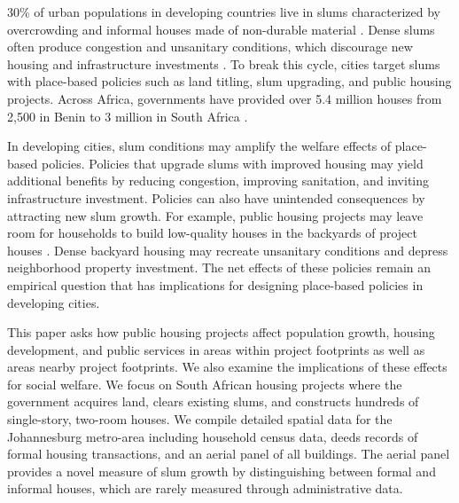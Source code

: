 \documentclass[12pt]{article}
\begin{document}
30\% of urban populations in developing countries live in slums characterized by overcrowding and informal houses made of non-durable material \citep{mdg}.  Dense slums often produce congestion and unsanitary conditions, which discourage new housing and infrastructure investments \citep{marx2013slums}.  To break this cycle, cities target slums with place-based policies such as land titling, slum upgrading, and public housing projects.  Across Africa, governments have provided over 5.4 million houses from 2,500 in Benin to 3 million in South Africa \citep{bah2018housing}.  



In developing cities, slum conditions may amplify the welfare effects of place-based policies.  Policies that upgrade slums with improved housing may yield additional benefits by reducing congestion, improving sanitation, and inviting infrastructure investment.  Policies can also have unintended consequences by attracting new slum growth.  For example, public housing projects may leave room for households to build low-quality houses in the backyards of project houses \citep{Brueckner2018backyarding}.  Dense backyard housing may recreate unsanitary conditions and depress neighborhood property investment.  The net effects of these policies remain an empirical question that has implications for designing place-based policies in developing cities.

This paper asks how public housing projects affect population growth, housing development, and public services in areas within project footprints as well as areas nearby project footprints.  We also examine the implications of these effects for social welfare.  We focus on South African housing projects where the government acquires land, clears existing slums, and constructs hundreds of single-story, two-room houses.  We compile detailed spatial data for the Johannesburg metro-area including household census data, deeds records of formal housing transactions, and an aerial panel of all buildings.  The aerial panel provides a novel measure of slum growth by distinguishing between formal and informal houses, which are rarely measured through administrative data.  
\end{document}
